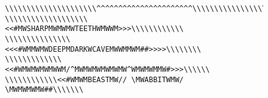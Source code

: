 \documentclass{metanorma}
\begin{document}
\begin{figure}[h]
\begin{verbatim}
\\\\\\\\\\\\\\\\\\\\\^^^^^^^^^^^^^^^^^^^^^^\\\\\\\\\\\\\\\\\
\\\\\\\\\\\\\\\\\\\<<#MWSHARPMWMWMWTEETHWMWWM>>>\\\\\\\\\\\\
\\\\\\\\\\\\\\\<<<#WMMWMWDEEPMDARKWCAVEMWWMMWM##>>>>\\\\\\\\
\\\\\\\\\\\\\<<#WMWMWMWMWWM/^MWMWMWMWMWMW^WMWMWMMW#>>>\\\\\\
\\\\\\\\\\\\<<#WMWMBEASTMW// \MWABBITWMW/ \MWMWMWMW##\\\\\\\

\end{verbatim}
\end{figure}
\end{document}
